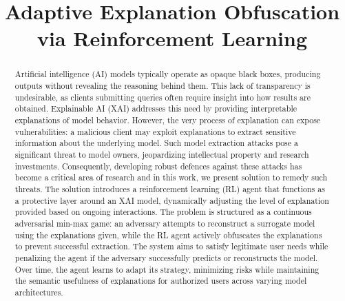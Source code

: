 \documentclass[conference]{IEEEtran}
\begin{document}
\title{Adaptive Explanation Obfuscation via Reinforcement Learning}

\author{
\and
{}
\and
{}
\and
{}
}

\maketitle

\begin{abstract}
Artificial intelligence (AI) models typically operate as opaque black boxes, producing outputs without revealing the reasoning behind them. This lack of transparency is undesirable, as clients submitting queries often require insight into how results are obtained. Explainable AI (XAI) addresses this need by providing interpretable explanations of model behavior. However, the very process of explanation can expose vulnerabilities: a malicious client may exploit explanations to extract sensitive information about the underlying model. Such model extraction attacks pose a significant threat to model owners, jeopardizing intellectual property and research investments. Consequently, developing robust defences against these attacks has become a critical area of research and in this work, we present solution to remedy such threats. The solution introduces a reinforcement learning (RL) agent that functions as a protective layer around an XAI model, dynamically adjusting the level of explanation provided based on ongoing interactions. The problem is structured as a continuous adversarial min-max game: an adversary attempts to reconstruct a surrogate model using the explanations given, while the RL agent actively obfuscates the explanations to prevent successful extraction. The system aims to satisfy legitimate user needs while penalizing the agent if the adversary successfully predicts or reconstructs the model. Over time, the agent learns to adapt its strategy, minimizing risks while maintaining the semantic usefulness of explanations for authorized users across varying model architectures.
\end{abstract}
\end{document}
